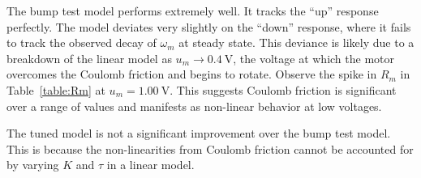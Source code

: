 The bump test model performs extremely well.
It tracks the ``up'' response perfectly.
The model deviates very slightly on the ``down'' response, where it fails to track the observed decay of $\omega_m$ at steady state.
This deviance is likely due to a breakdown of the linear model as $u_m \rightarrow \SI{0.4}{\volt}$, the voltage at which the motor overcomes the Coulomb friction and begins to rotate.
Observe the spike in $R_m$ in Table~\ref{table:Rm} at $u_m = \SI{1.00}{\volt}$.
This suggests Coulomb friction is significant over a range of values and manifests as non-linear behavior at low voltages. 

The tuned model is not a significant improvement over the bump test model.
This is because the non-linearities from Coulomb friction cannot be accounted for by varying $K$ and $\tau$ in a linear model.
